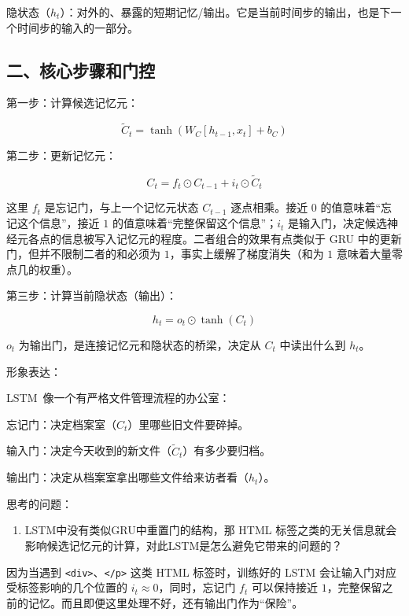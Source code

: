 隐状态（\(h_t\)）：对外的、暴露的短期记忆/输出。它是当前时间步的输出，也是下一个时间步的输入的一部分。

\hypertarget{ux4e8cux6838ux5fc3ux6b65ux9aa4ux548cux95e8ux63a7}{%
\subsection{二、核心步骤和门控}\label{ux4e8cux6838ux5fc3ux6b65ux9aa4ux548cux95e8ux63a7}}

第一步：计算候选记忆元：

\[
\tilde{C}_t = \tanh(W_C [h_{t-1}, x_t] + b_C)
\]

第二步：更新记忆元：

\[
C_t = f_t \odot C_{t-1} + i_t \odot \tilde{C}_t
\]

这里 \(f_t\) 是忘记门，与上一个记忆元状态 \(C_{t-1}\) 逐点相乘。接近 \(0\) 的值意味着``忘记这个信息''，接近 \(1\) 的值意味着``完整保留这个信息''；\(i_t\) 是输入门，决定候选神经元各点的信息被写入记忆元的程度。二者组合的效果有点类似于 GRU 中的更新门，但并不限制二者的和必须为 \(1\)，事实上缓解了梯度消失（和为 \(1\) 意味着大量零点几的权重）。

第三步：计算当前隐状态（输出）：

\[
h_t = o_t \odot \tanh(C_t)
\]

\(o_t\) 为输出门，是连接记忆元和隐状态的桥梁，决定从 \(C_t\) 中读出什么到 \(h_t\)。

形象表达：

LSTM~像一个有严格文件管理流程的办公室：

忘记门：决定档案室（\(C_t\)）里哪些旧文件要碎掉。

输入门：决定今天收到的新文件（\(\tilde{C}_t\)）有多少要归档。

输出门：决定从档案室拿出哪些文件给来访者看（\(h_t\)）。

思考的问题：

\begin{enumerate}
\def\labelenumi{\arabic{enumi}.}
\tightlist
\item
  LSTM中没有类似GRU中重置门的结构，那 HTML 标签之类的无关信息就会影响候选记忆元的计算，对此LSTM是怎么避免它带来的问题的？
\end{enumerate}

因为当遇到 \texttt{\textless{}div\textgreater{}}、\texttt{\textless{}/p\textgreater{}} 这类 HTML 标签时，训练好的 LSTM 会让输入门对应受标签影响的几个位置的 \(i_t \approx 0\)，同时，忘记门 \(f_t\) 可以保持接近 \(1\)，完整保留之前的记忆。而且即便这里处理不好，还有输出门作为``保险''。

